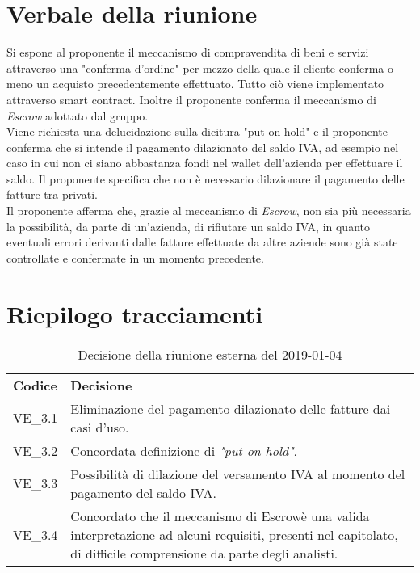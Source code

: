 \section{Verbale della riunione}
Si espone al proponente il meccanismo di compravendita di beni e servizi attraverso
una "conferma d'ordine\glo" per mezzo della quale il cliente conferma o meno un acquisto precedentemente effettuato.
Tutto ciò viene implementato attraverso smart contract\glo{}. Inoltre il proponente
conferma il meccanismo di \textit{Escrow\glo{}} adottato dal gruppo. \\
Viene richiesta una delucidazione sulla dicitura "put on hold" e il proponente conferma
che si intende il pagamento dilazionato del saldo IVA, ad esempio nel caso in cui non 
ci siano abbastanza fondi nel wallet\glo{} dell'azienda per effettuare il saldo. 
Il proponente specifica che non è necessario dilazionare il pagamento delle fatture 
tra privati. \\
Il proponente afferma che, grazie al meccanismo di \textit{Escrow\glo{}}, non sia più necessaria la possibilità, da parte di un'azienda, di rifiutare un saldo IVA, in quanto eventuali errori derivanti dalle fatture effettuate da altre aziende sono già state controllate e confermate in un momento precedente.

\pagebreak

\section{Riepilogo tracciamenti}
\begin{table}[H]
	
	\begin{longtable}{ >{\centering}p{} >{\centering}p{}}
			
		\rowcolorhead
		\centering \textbf{\color{white}Codice} 
		& \centering \textbf{\color{white}Decisione} 
		
		\tabularnewline 
		VE\_3.1 & Eliminazione del pagamento dilazionato delle fatture dai casi d'uso.
		
		\tabularnewline 
		VE\_3.2 & Concordata definizione di \textit{"put on hold"}.
		
		\tabularnewline 
		VE\_3.3 & Possibilità di dilazione del versamento IVA al momento del 
						pagamento del saldo IVA.
		\tabularnewline 
		VE\_3.4 & Concordato che il meccanismo di Escrow\glosp è una valida interpretazione ad alcuni requisiti, presenti nel capitolato\glo, di difficile comprensione da parte degli analisti.

		
	\end{longtable}
	\caption{Decisione della riunione esterna del 2019-01-04}	

\end{table}


